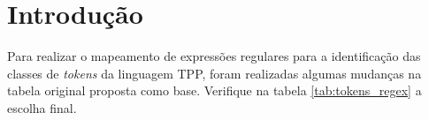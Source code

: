 \documentclass[
	12pt,				%
	oneside,   	        %
	a4paper,			%
	english,			%
	french,				%
	spanish,			%
	brazilian,				%
	]{pacotes/abntex2}
\begin{document}
\frenchspacing 

\imprimirfolhaderosto

\tableofcontents*
\cleardoublepage

\textual

\makeatletter
\renewcommand{\chapter}{\@gobbletwo}
\makeatother

\section{Introdução}
\label{sec:introducao}
    
Para realizar o mapeamento de expressões regulares para a identificação das classes de \textit{tokens} da linguagem TPP, foram realizadas algumas mudanças na tabela original \cite{regex-tokens} proposta como base. Verifique na tabela \ref{tab:tokens_regex} a escolha final.
\end{document}

